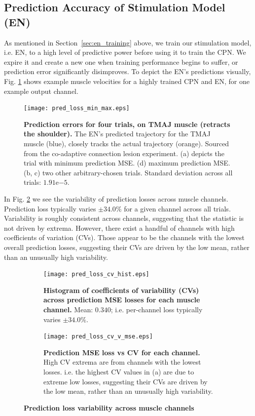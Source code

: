 \documentclass[12pt]{iopart}
\begin{document}
\subsection{Prediction Accuracy of Stimulation Model (EN)}
\label{sup:pred_losses}

As mentioned in Section~\ref{sec:en_training} above, we train our stimulation model, i.e. EN, to a high
level of predictive power before using it to train the CPN. We expire it and create a new one when training
performance begins to suffer, or prediction error significantly disimproves. To depict the EN's predictions
visually, Fig. \ref{fig:pred_loss_examples} shows example muscle velocities for a highly trained CPN and EN,
for one example output channel.

\begin{figure}[h!]
\centering
\texttt{[image: pred\_loss\_min\_max.eps]}
\caption{\textbf{Prediction errors for four trials, on TMAJ muscle (retracts the shoulder).}
         The EN's predicted trajectory for the TMAJ muscle (blue), closely tracks the actual
         trajectory (orange). Sourced from the co-adaptive connection lesion experiment.
         (a) depicts the trial with minimum prediction MSE. (d) maximum prediction
         MSE. (b, c) two other arbitrary-chosen trials. Standard deviation across all trials:
         $1.91\mathrm{e}{-5}$.}
\label{fig:pred_loss_examples}
\end{figure}

In Fig. \ref{fig:pred_loss_cv} we see the variability of prediction losses across muscle
channels. Prediction loss typically varies $\pm34.0\%$ for a given channel across all
trials. Variability is roughly consistent across channels, suggesting that the statistic
is not driven by extrema. However, there exist a handful of channels with high
coefficients of variation (CVs). Those appear to be the channels with the lowest overall
prediction losses, suggesting their CVs are driven by the low mean, rather than an unusually
high variability.

\begin{figure}
	\centering
	\begin{subfigure}[c]{0.48\textwidth}
		\centering
		\texttt{[image: pred\_loss\_cv\_hist.eps]}
		\caption{\textbf{Histogram of coefficients of variability (CVs) across prediction MSE
                 losses for each muscle channel.} Mean: $0.340$; i.e. per-channel loss
                 typically varies $\pm34.0\%$.}
	\end{subfigure}
	\hfill
	\begin{subfigure}[c]{0.48\textwidth}
		\centering
		\texttt{[image: pred\_loss\_cv\_v\_mse.eps]}
		\caption{\textbf{Prediction MSE loss vs CV for each channel.} High CV extrema are from channels
                 with the lowest losses. i.e. the highest CV values in (a) are due to extreme
                 low losses, suggesting their CVs are driven by the low mean, rather than an
                 unusually high variability.}
	\end{subfigure}
	\hfill
\caption{\textbf{Prediction loss variability across muscle channels}}
\label{fig:pred_loss_cv}
\end{figure}
\end{document}
